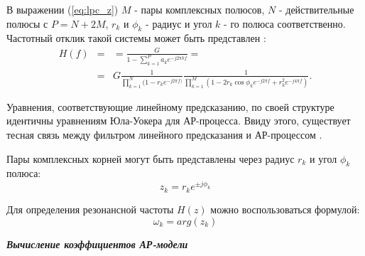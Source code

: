 В выражении (\ref{eq:lpc_z}) ${M}$ - пары комплексных полюсов, ${N}$ - действительные полюсы с ${P=N+2M}$,
${r_k}$ и ${\phi_k}$ - радиус и угол ${k}$ - го полюса соответственно. Частотный отклик такой системы 
может быть представлен \cite{saeed_book}:
\begin{eqnarray}
	\label{eq:lpc_freq_resp}
		H(f)	& = & = \frac{G}{1 - \sum \limits_{k=1}^P a_k e^{-j2 \pi kf}} =  \nonumber \\
			& = & G\frac{1}{\prod \limits_{k=1}^N (1-r_k e^{-j2 \pi f)}} \frac{1}{\prod \limits_{k=1}^M (1-2r_k \cos \phi_k e^{-j2 \pi f} + r_k^2 e^{-j4 \pi f})}.
\end{eqnarray}

Уравнения, соответствующие линейному предсказанию, по своей структуре идентичны уравнениям Юла-Уокера для АР-процесса.
Ввиду этого, существует тесная связь между фильтром линейного предсказания и АР-процессом \cite{marpl_book}.

Пары комплексных корней могут быть представлены через радиус ${r_k}$ и угол ${\phi_k}$ полюса:
\begin{equation}
	\label{eq:lpc_poles}
	z_k = r_k e^{\pm j \phi_k}
\end{equation}

Для определения резонансной частоты ${H(z)}$ можно воспользоваться формулой:
\begin{equation}
	\label{eq:lpc_poles_freq}
	\omega_k = arg(z_k)
\end{equation}


{\bf{\textit{Вычисление коэффициентов АР-модели}}}

